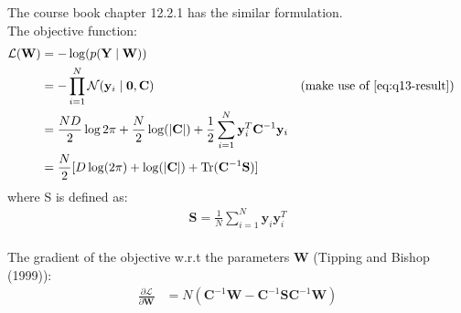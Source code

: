 \documentclass[12pt]{article}
\newenvironment{question}[2][Question]{\begin{trivlist}
\kern10pt
\item[\hskip \labelsep {\bfseries #1}\hskip \labelsep {\bfseries #2.}]}{\end{trivlist}}
\begin{document}
\begin{question}{15}
The course book chapter 12.2.1 has the similar formulation.\\
The objective function:
\begin{align*}
  \mathcal{L}(\mathbf{W}) &= -\log(p(\mathbf{Y}\mid\mathbf{W})) \\
  &= -\prod_{i=1}^{N} \mathcal{N}(\mathbf{y}_i\mid\mathbf{0}, \mathbf{C})
      && \text{(make use of \eqref{eq:q13-result})} \\
  &= \frac{ND}{2}\log{2\pi} + \frac{N}{2}\log(|\mathbf{C}|) 
     + \frac{1}{2} \sum_{i=1}^{N} \mathbf{y}_i^T \mathbf{C}^{-1}\mathbf{y}_i \\
  &= \frac{N}{2}[D\log(2\pi) + \log(|\mathbf{C}|) + \text{Tr}(\mathbf{C}^{-1}\mathbf{S})]
\end{align*}
where S is defined as:
\begin{align*}
  \mathbf{S} = \frac{1}{N}\sum_{i=1}^{N} \mathbf{y}_i\mathbf{y}_i^T
\end{align*}
\\
The gradient of the objective w.r.t the parameters $\mathbf{W}$
(Tipping and Bishop (1999)):
\begin{align*}
  \frac{\partial{\mathcal{L}}}{\partial{\mathbf{W}}} 
    &= N(\mathbf{C}^{-1}\mathbf{W} 
         - \mathbf{C}^{-1}\mathbf{S}\mathbf{C}^{-1}\mathbf{W})
\end{align*}
\end{question}
\end{document}
